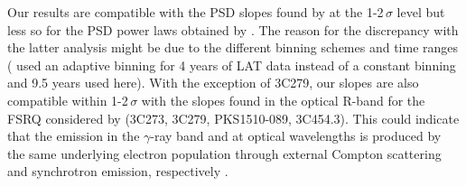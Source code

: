 \documentclass[twocolumn,linenumbers]{aastex62}
\newcommand{\gray}{$\gamma$-ray\xspace}
\begin{document}
Our results are compatible with the PSD slopes found by \citet{2013ApJ...773..177N} at the 1-2\,$\sigma$ level but less so for the PSD power laws obtained by \citet{2014ApJ...786..143S}. 
The reason for the discrepancy with the latter analysis might be due to the different binning schemes and time ranges (\citealt{2014ApJ...786..143S} used an adaptive binning for 4 years of LAT data instead of a constant binning and 9.5 years used here). 
With the exception of 3C279, our slopes are also compatible within 1-2\,$\sigma$ with the slopes found in the optical R-band for the FSRQ considered by \citet{2012ApJ...749..191C} (3C273, 3C279, PKS1510-089, 3C454.3). 
This could indicate that the emission in the \gray band and at optical wavelengths is produced by the same underlying electron population through external Compton scattering and synchrotron emission, respectively \citep{2014ApJ...791...21F,2015ApJ...809...85F}.  
\end{document}
